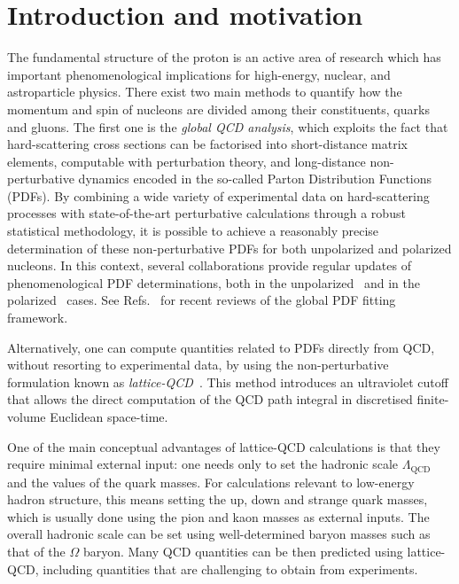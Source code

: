 \section{Introduction and motivation}


The fundamental structure of the proton is an active area of research
which has important phenomenological implications for
high-energy, nuclear, and astroparticle physics.
%
There exist two main methods to quantify how the momentum and spin of
nucleons
are divided among their constituents, quarks and gluons.
%
The first one
is the {\it global QCD analysis}, which exploits the fact that hard-scattering
cross sections can be factorised into short-distance matrix elements,
computable with perturbation theory, and long-distance
non-perturbative dynamics encoded in the
so-called Parton Distribution Functions (PDFs).
%
By combining a wide variety of experimental data on hard-scattering processes
with state-of-the-art perturbative calculations through a robust statistical
methodology, it is possible to achieve a reasonably precise determination
of these non-perturbative PDFs for both unpolarized and polarized nucleons.
%
In this context, several collaborations provide regular updates of
phenomenological PDF determinations, both
in the unpolarized~\cite{Ball:2014uwa,Ball:2017nwa,Harland-Lang:2014zoa,
Dulat:2015mca,Alekhin:2017kpj,Owens:2012bv} and in
the polarized~\cite{Nocera:2014gqa,deFlorian:2009vb,
  Sato:2016tuz,Hirai:2008aj} cases.
%
See Refs.~\cite{Rojo:2015acz,Butterworth:2015oua,Ball:2012wy,
Alekhin:2011sk,Forte:2013wc,Forte:2010dt,Perez:2012um,DeRoeck:2011na,
Accardi:2016ndt,Gao:2017yyd}
for recent reviews of the global PDF fitting framework.

Alternatively, one can compute quantities related to PDFs directly 
from QCD, without resorting to
experimental data, by using the non-perturbative formulation known as
{\it lattice-QCD}~\cite{Olive:2016xmw,Gupta:1997nd}.
%
This method introduces an ultraviolet cutoff that allows the direct 
computation of the QCD path integral in discretised finite-volume 
Euclidean space-time.
%

One of the main
conceptual advantages of lattice-QCD calculations is that
they require minimal external input: one needs only to 
set the hadronic scale $\Lambda_\text{QCD}$ and the values of the quark masses.
%
For calculations relevant to low-energy hadron structure, this means
setting the up, down and strange quark masses,
which is usually done using the pion and kaon masses as external inputs.
%
The overall hadronic scale can be set using well-determined baryon masses 
such as that of the $\Omega$ baryon.
%
Many QCD quantities can be then predicted 
using lattice-QCD, including quantities that are challenging to obtain from
experiments. %

